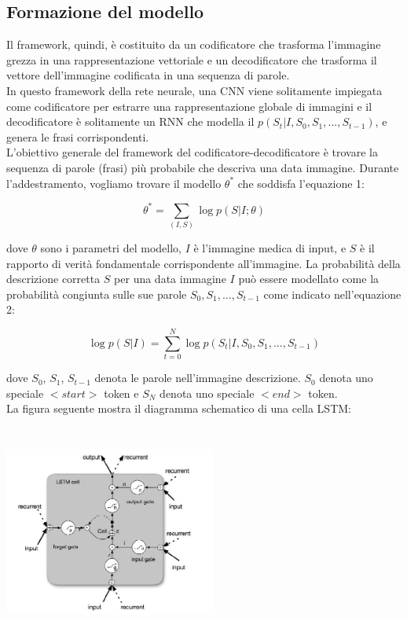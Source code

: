 \documentclass[12pt,a4paper]{report}
\begin{document}
\subsection{Formazione del modello}
Il framework, quindi, è costituito da un codificatore che trasforma l'immagine grezza in una rappresentazione vettoriale e un decodificatore che trasforma il vettore dell'immagine codificata in una sequenza di parole.\\
In questo framework della rete neurale, una CNN viene solitamente impiegata come codificatore per estrarre una rappresentazione globale di immagini e il decodificatore è solitamente un RNN che modella il $p(S_t|I, S_0, S_1, . . . ,S_{t-1})$, e genera le frasi corrispondenti.\\
L'obiettivo generale del framework del codificatore-decodificatore è trovare la sequenza di parole (frasi) più probabile che descriva una data immagine. Durante l'addestramento, vogliamo trovare il modello $\theta^*$ che soddisfa l’equazione 1:

\begin{equation}
{\displaystyle \theta^* =  \sum\limits_{(I, S)} \log p(S | I; \theta)}
\end{equation}

dove $\theta$ sono i parametri del modello, $I$ è l'immagine medica di input, e $S$ è il rapporto di verità fondamentale corrispondente all'immagine. La probabilità della descrizione corretta $S$ per una data immagine $I$ può essere modellato come la probabilità congiunta sulle sue parole $S_0, S_1, … ,S_{t-1}$ come indicato nell'equazione 2:

\begin{equation}
{\displaystyle \log p(S|I) =  \sum\limits_{t = 0}^{N} \log p(S_t | I, S_0, S_1, ..., S_{t-1})}
\end{equation}

dove $S_0$, $S_1$, $S_{t-1}$ denota le parole nell'immagine descrizione. $S_0$ denota uno speciale $<start>$ token e $S_N$ denota uno speciale $<end>$ token.\\
La figura seguente mostra il diagramma schematico di una cella LSTM:

\begin{center}
\includegraphics[width=7cm,height=7cm,keepaspectratio]{diagram_LSTM}
\end{center}
\end{document}
